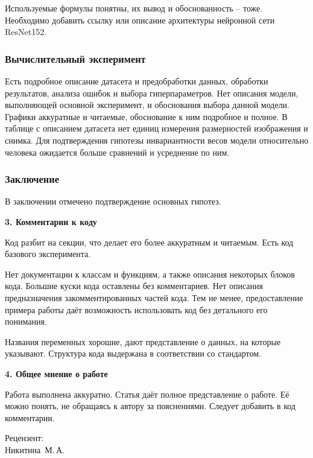 \documentclass[12pt, a4paper]{extarticle}
\begin{document}
Используемые формулы понятны, их вывод и обоснованность -- тоже. Необходимо добавить ссылку или описание архитектуры нейронной сети ResNet152.

\subsubsection*{Вычислительный эксперимент}

Есть подробное описание датасета и предобработки данных, обработки результатов, анализа ошибок и выбора гиперпараметров. Нет описания модели, выполняющей основной эксперимент, и обоснования выбора данной модели. Графики аккуратные и читаемые, обоснование к ним подробное и полное. В таблице с описанием датасета нет единиц измерения размерностей изображения и снимка. Для подтверждения гипотезы инвариантности весов модели относительно человека ожидается больше сравнений и усреднение по ним.

\subsubsection*{Заключение}

В заключении отмечено подтверждение основных гипотез.

\begin{center}
    \textbf{3. Комментарии к коду}
\end{center}

Код разбит на секции, что делает его более аккуратным и читаемым. Есть код базового эксперимента.

Нет документации к классам и функциям, а также описания некоторых блоков кода. Большие куски кода оставлены без комментариев. Нет описания предназначения закомментированных частей кода. Тем не менее, предоставление примера работы даёт возможность использовать код без детального его понимания.

Названия переменных хорошие, дают представление о данных, на которые указывают. Структура кода выдержана в соответствии со стандартом.

\begin{center}
    \textbf{4. Общее мнение о работе}
\end{center}

Работа выполнена аккуратно. Статья даёт полное представление о работе. Её можно понять, не обращаясь к автору за пояснениями. Следует добавить в код комментарии.

\vspace{2cm}

\begin{flushleft}
    Рецензент:\\
    Никитина~М.\,А.
\end{flushleft}
\end{document}
